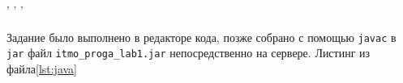     \begin{center}
        ' ' '
    \end{center}

    \newpage
    Задание было выполнено в редакторе кода, позже собрано с помощью \verb|javac| в \verb|jar| файл \verb|itmo_proga_lab1.jar| непосредственно на сервере.
    Листинг из файла\ref{lst:java}
    







